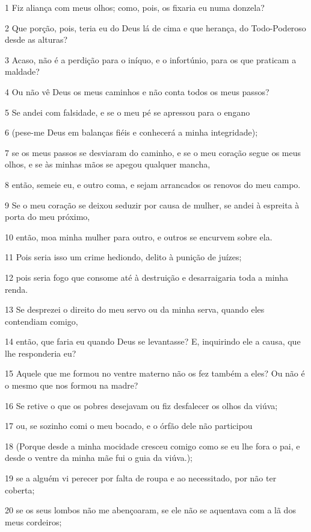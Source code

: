 \par 1 Fiz aliança com meus olhos; como, pois, os fixaria eu numa donzela?
\par 2 Que porção, pois, teria eu do Deus lá de cima e que herança, do Todo-Poderoso desde as alturas?
\par 3 Acaso, não é a perdição para o iníquo, e o infortúnio, para os que praticam a maldade?
\par 4 Ou não vê Deus os meus caminhos e não conta todos os meus passos?
\par 5 Se andei com falsidade, e se o meu pé se apressou para o engano
\par 6 (pese-me Deus em balanças fiéis e conhecerá a minha integridade);
\par 7 se os meus passos se desviaram do caminho, e se o meu coração segue os meus olhos, e se às minhas mãos se apegou qualquer mancha,
\par 8 então, semeie eu, e outro coma, e sejam arrancados os renovos do meu campo.
\par 9 Se o meu coração se deixou seduzir por causa de mulher, se andei à espreita à porta do meu próximo,
\par 10 então, moa minha mulher para outro, e outros se encurvem sobre ela.
\par 11 Pois seria isso um crime hediondo, delito à punição de juízes;
\par 12 pois seria fogo que consome até à destruição e desarraigaria toda a minha renda.
\par 13 Se desprezei o direito do meu servo ou da minha serva, quando eles contendiam comigo,
\par 14 então, que faria eu quando Deus se levantasse? E, inquirindo ele a causa, que lhe responderia eu?
\par 15 Aquele que me formou no ventre materno não os fez também a eles? Ou não é o mesmo que nos formou na madre?
\par 16 Se retive o que os pobres desejavam ou fiz desfalecer os olhos da viúva;
\par 17 ou, se sozinho comi o meu bocado, e o órfão dele não participou
\par 18 (Porque desde a minha mocidade cresceu comigo como se eu lhe fora o pai, e desde o ventre da minha mãe fui o guia da viúva.);
\par 19 se a alguém vi perecer por falta de roupa e ao necessitado, por não ter coberta;
\par 20 se os seus lombos não me abençoaram, se ele não se aquentava com a lã dos meus cordeiros;
